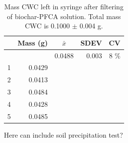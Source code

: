 \begin{table}
\centering
\caption{Mass CWC left in syringe after filtering of biochar-PFCA solution. Total mass CWC is 0.1000 $\pm$ 0.004 g.}
\label{appTab:CWCloss}
\begin{tabular}{rrrrr} \toprule
 & Mass (g) & \multicolumn{1}{c}{$\bar{x}$} & \multicolumn{1}{c}{SDEV} & \multicolumn{1}{c}{CV}  \\ \midrule
 & & 0.0488 & 0.003 & 8 $\%$ \\
1 & 0.0429 \\
2 & 0.0413 \\
3 & 0.0484 \\
4 & 0.0428 \\
5 & 0.0485 \\ \bottomrule
\end{tabular}
\end{table}

Here can include soil precipitation test?

